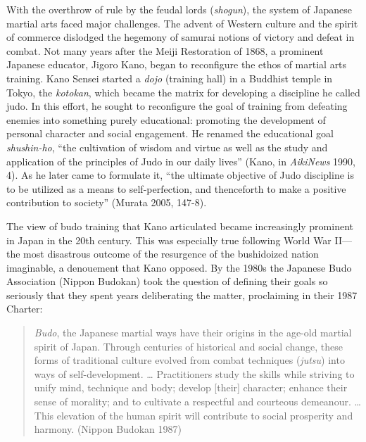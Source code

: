 With the overthrow of rule by the feudal lords (\emph{shogun}), the system of Japanese martial arts faced major challenges. The advent of Western culture and the spirit of commerce dislodged the hegemony of samurai notions of victory and defeat in combat. Not many years after the Meiji Restoration of 1868, a prominent Japanese educator, Jigoro Kano, began to reconfigure the ethos of martial arts training. Kano Sensei started a \emph{dojo} (training hall) in a Buddhist temple in Tokyo, the \emph{kotokan}, which became the matrix for developing a discipline he called judo. In this effort, he sought to reconfigure the goal of training from defeating enemies into something purely educational: promoting the development of personal character and social engagement. He renamed the educational goal \emph{shushin-ho}, ``the cultivation of wisdom and virtue as well as the study and application of the principles of Judo in our daily lives'' (Kano, in \emph{AikiNews} 1990, 4). As he later came to formulate it, ``the ultimate objective of Judo discipline is to be utilized as a means to self-perfection, and thenceforth to make a positive contribution to society'' (Murata 2005, 147-8).

The view of budo training that Kano articulated became increasingly prominent in Japan in the 20th century. This was especially true following World War II---the most disastrous outcome of the resurgence of the bushidoized nation imaginable, a denouement that Kano opposed. By the 1980s the Japanese Budo Association (Nippon Budokan) took the question of defining their goals so seriously that they spent years deliberating the matter, proclaiming in their 1987 Charter: 

\begin{quote}
\emph{Budo}, the Japanese martial ways have their origins in the age-old martial spirit of Japan. Through centuries of historical and social change, these forms of traditional culture evolved from combat techniques (\emph{jutsu}) into ways of self-development. \ldots{} Practitioners study the skills while striving to unify mind, technique and body; develop [their] character; enhance their sense of morality; and to cultivate a respectful and courteous demeanour. \ldots{} This elevation of the human spirit will contribute to social prosperity and harmony. (Nippon Budokan 1987) 
\end{quote}

